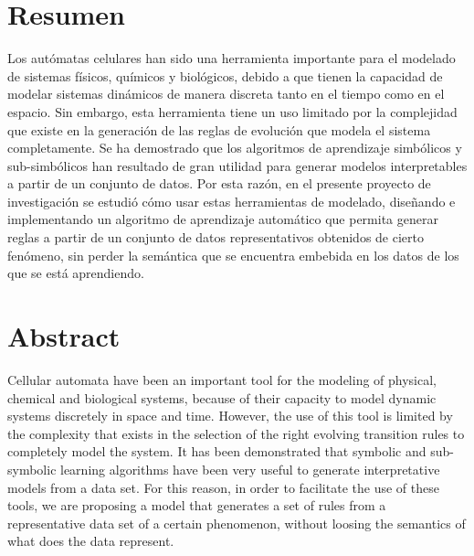 \pagestyle{plain}
\chapter*{Resumen}
\bigskip
\noindent Los autómatas celulares han sido una herramienta importante para el modelado de sistemas físicos, químicos y biológicos, debido a que tienen la capacidad de modelar sistemas dinámicos de manera discreta tanto en el tiempo como en el espacio. Sin embargo, esta herramienta tiene un uso limitado por la complejidad que existe en la generación de las reglas de evolución que modela el sistema completamente. Se ha demostrado que los algoritmos de aprendizaje simbólicos y sub-simbólicos han resultado de gran utilidad para generar modelos interpretables a partir de un conjunto de datos. Por esta razón, en el presente proyecto de investigación se estudió cómo usar estas herramientas de modelado, diseñando e implementando un algoritmo de aprendizaje automático que permita generar reglas a partir de un conjunto de datos representativos obtenidos de cierto fenómeno, sin perder la semántica que se encuentra embebida en los datos de los que se está aprendiendo.

\chapter*{Abstract}
\bigskip
Cellular automata have been an important tool for the modeling of physical, chemical and biological systems, because of their capacity to model dynamic systems discretely in space and time. However, the use of this tool is limited by the complexity that exists in the selection of the right evolving transition rules to completely model the system. It has been demonstrated that symbolic and sub-symbolic learning algorithms have been very useful to generate interpretative models from a data set. For this reason, in order to facilitate the use of these tools, we are proposing a model that generates a set of rules from a representative data set of a certain phenomenon, without loosing the semantics of what does the data represent.
